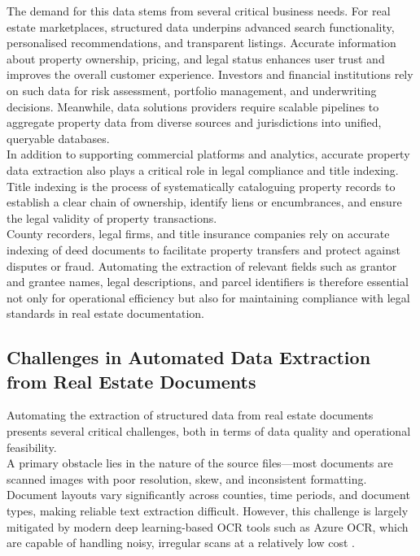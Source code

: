 \documentclass{article}
\begin{document}
The demand for this data stems from several critical business needs. For real estate marketplaces, structured data underpins advanced search functionality, personalised recommendations, and transparent listings. Accurate information about property ownership, pricing, and legal status enhances user trust and improves the overall customer experience. Investors and financial institutions rely on such data for risk assessment, portfolio management, and underwriting decisions. Meanwhile, data solutions providers require scalable pipelines to aggregate property data from diverse sources and jurisdictions into unified, queryable databases. \\

In addition to supporting commercial platforms and analytics, accurate property data extraction also plays a critical role in legal compliance and title indexing. Title indexing is the process of systematically cataloguing property records to establish a clear chain of ownership, identify liens or encumbrances, and ensure the legal validity of property transactions. \\

County recorders, legal firms, and title insurance companies rely on accurate indexing of deed documents to facilitate property transfers and protect against disputes or fraud. Automating the extraction of relevant fields such as grantor and grantee names, legal descriptions, and parcel identifiers is therefore essential not only for operational efficiency but also for maintaining compliance with legal standards in real estate documentation. \\

\subsection{Challenges in Automated Data Extraction from Real Estate Documents}

Automating the extraction of structured data from real estate documents presents several critical challenges, both in terms of data quality and operational feasibility. \\

A primary obstacle lies in the nature of the source files—most documents are scanned images with poor resolution, skew, and inconsistent formatting. Document layouts vary significantly across counties, time periods, and document types, making reliable text extraction difficult. However, this challenge is largely mitigated by modern deep learning-based OCR tools such as Azure OCR, which are capable of handling noisy, irregular scans at a relatively low cost \cite{azureocr}. \\
\end{document}
